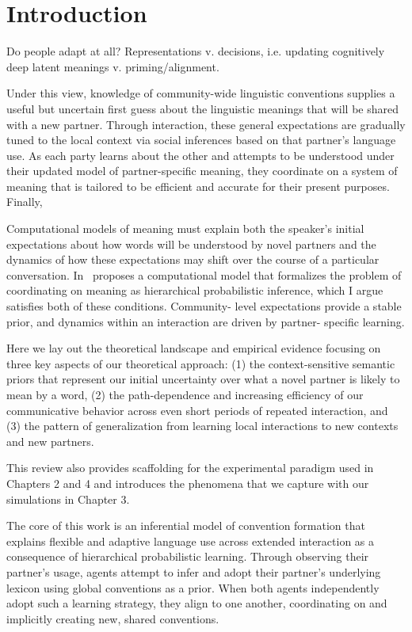 \documentclass[11pt]{article}
\begin{document}
\section*{Introduction}

Do people adapt at all? 
Representations v. decisions, i.e. updating cognitively deep latent meanings v. priming/alignment.

Under this view, knowledge of community-wide linguistic conventions supplies a useful but uncertain first guess about the linguistic meanings that will be shared with a new partner. 
Through interaction, these general expectations are gradually tuned to the local context via social inferences based on that partner's language use. 
As each party learns about the other and attempts to be understood under their updated model of partner-specific meaning, they coordinate on a system of meaning that is tailored to be efficient and accurate for their present purposes.
Finally, 

Computational models of meaning must explain both the speaker’s initial expectations about how words will be understood by novel partners and the dynamics of how these expectations may shift over the course of a particular conversation. In \ proposes a computational model that formalizes the problem of coordinating on meaning as hierarchical probabilistic inference, which I argue satisfies both of these conditions. Community- level expectations provide a stable prior, and dynamics within an interaction are driven by partner- specific learning.

Here we lay out the theoretical landscape and empirical evidence focusing on three key aspects of our theoretical approach: (1) the context-sensitive semantic priors that represent our initial uncertainty over what a novel partner is likely to mean by a word, (2) the path-dependence and increasing efficiency of our communicative behavior across even short periods of repeated interaction, and (3) the pattern of generalization from learning local interactions to new contexts and new partners. 

This review also provides scaffolding for the experimental paradigm used in Chapters 2 and 4 and introduces the phenomena that we capture with our simulations in Chapter 3.

The core of this work is an inferential model of convention formation that explains flexible and adaptive language use across extended interaction as a consequence of hierarchical probabilistic learning. Through observing their partner's usage, agents attempt to infer and adopt their partner's underlying lexicon using global conventions as a prior. When both agents independently adopt such a learning strategy, they align to one another, coordinating on and implicitly creating new, shared conventions. 
\end{document}
